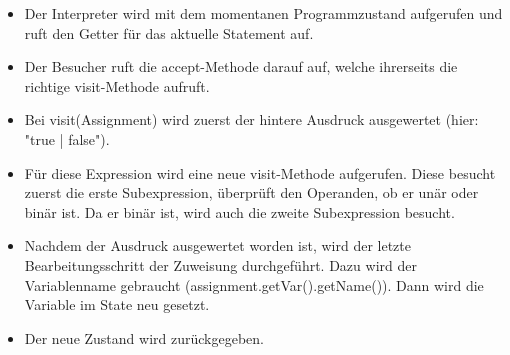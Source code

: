 \documentclass[10pt,a4paper,titlepage]{article}
\begin{document}
\begin{itemize}
\item Der Interpreter wird mit dem momentanen Programmzustand aufgerufen und ruft den Getter für das aktuelle Statement auf.
\item Der Besucher ruft die accept-Methode darauf auf, welche ihrerseits die richtige visit-Methode aufruft.
\item Bei visit(Assignment) wird zuerst der hintere Ausdruck ausgewertet (hier: "true | false").
\item Für diese Expression wird eine neue visit-Methode aufgerufen. Diese besucht zuerst die erste Subexpression, überprüft den Operanden, ob er unär oder binär ist. Da er binär ist, wird auch die zweite Subexpression besucht.
\item Nachdem der Ausdruck ausgewertet worden ist, wird der letzte Bearbeitungsschritt der Zuweisung durchgeführt. Dazu wird der Variablenname gebraucht (assignment.getVar().getName()). Dann wird die Variable im State neu gesetzt.
\item Der neue Zustand wird zurückgegeben.
\end{itemize}
\end{document}
